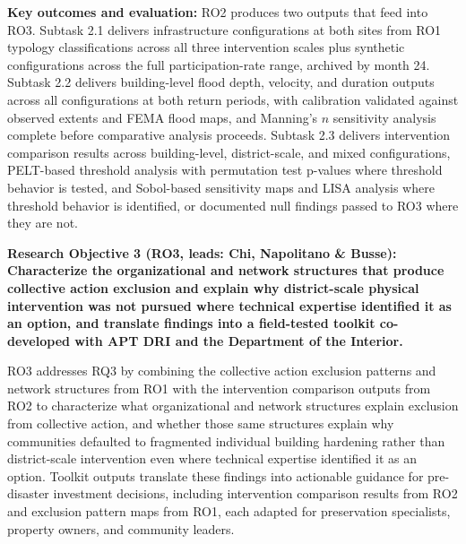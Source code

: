 \documentclass[11pt]{article}
\begin{document}
\textbf{Key outcomes and evaluation:}
RO2 produces two outputs that feed into RO3.
Subtask 2.1 delivers infrastructure configurations at both sites from RO1 typology
classifications across all three intervention scales plus synthetic configurations
across the full participation-rate range, archived by month 24.
Subtask 2.2 delivers building-level flood depth, velocity, and duration outputs
across all configurations at both return periods, with calibration validated against
observed extents and FEMA flood maps, and Manning's $n$ sensitivity analysis
complete before comparative analysis proceeds.
Subtask 2.3 delivers intervention comparison results across building-level,
district-scale, and mixed configurations, PELT-based threshold analysis with
permutation test p-values where threshold behavior is tested, and Sobol-based
sensitivity maps and LISA analysis where threshold behavior is identified, or
documented null findings passed to RO3 where they are not.
\begin{tcolorbox}[colback=roothreecol!60,colframe=black,boxrule=1pt,coltext=black,
  left=1mm,right=1mm,top=1mm,bottom=1mm]
\textbf{Research Objective 3 (RO3, leads: Chi, Napolitano \& Busse): Characterize
the organizational and network structures that produce collective action exclusion
and explain why district-scale physical intervention was not pursued where technical
expertise identified it as an option, and translate findings into a field-tested
toolkit co-developed with APT DRI and the Department of the Interior.}
\end{tcolorbox}
RO3 addresses RQ3 by combining the collective action exclusion patterns and network
structures from RO1 with the intervention comparison outputs from RO2 to characterize
what organizational and network structures explain exclusion from collective action,
and whether those same structures explain why communities defaulted to fragmented
individual building hardening rather than district-scale intervention even where
technical expertise identified it as an option.
Toolkit outputs translate these findings into actionable guidance for pre-disaster
investment decisions, including intervention comparison results from RO2 and
exclusion pattern maps from RO1, each adapted for preservation specialists, property
owners, and community leaders.
\end{document}
